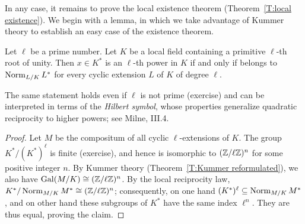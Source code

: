 In any case, it remains to prove the local existence theorem (Theorem~\ref{T:local existence}). We begin with a lemma, in which we take advantage of Kummer theory to establish an easy case of the existence theorem.
\begin{lemma} \label{L:hilbert symbol}
Let $\ell$ be a prime number. Let $K$ be a local field containing a primitive $\ell$-th root of unity. Then $x \in K^*$ is an $\ell$-th power in $K$ if and only if belongs to $\operatorname{Norm}_{L/K} L^*$ for every cyclic extension $L$ of $K$ of degree $\ell$.
\end{lemma}
The same statement holds even if $\ell$ is not prime (exercise)
and can be interpreted in terms of the \emph{Hilbert symbol}, whose properties generalize quadratic reciprocity to higher powers; see Milne, III.4.
\begin{proof}
Let $M$ be the compositum of all cyclic $\ell$-extensions of $K$.
The group $K^*/(K^*)^{\ell}$ is finite (exercise),
and hence is isomorphic to $(\mathbb{Z}/\ell \mathbb{Z})^n$ for some positive integer $n$.
By Kummer theory (Theorem~\ref{T:Kummer reformulated}),
we also have $\operatorname{Gal}(M/K) \cong (\mathbb{Z}/\ell \mathbb{Z})^n$. By the local reciprocity law,
$K^*/\operatorname{Norm}_{M/K}M^* \cong (\mathbb{Z}/\ell \mathbb{Z})^n$; consequently, on one hand
$(K^*)^{\ell} \subseteq \operatorname{Norm}_{M/K}M^*$, and on other hand these subgroups of $K^*$ have the same index $\ell^n$. They are thus equal, proving the claim.
\end{proof}

